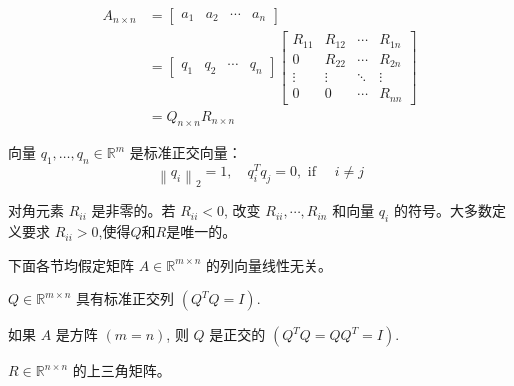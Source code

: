 \begin{theorem}[QR Factorization]
    
    \begin{equation}\begin{aligned} A_{n  \times n}&=\left[\begin{array}{llll}a_{1} & a_{2} & \cdots & a_{n}\end{array}\right]\\
        &=\left[\begin{array}{llll}q_{1} & q_{2} & \cdots & q_{n}\end{array}\right]\left[\begin{array}{cccc}R_{11} & R_{12} & \cdots & R_{1 n} \\ 0 & R_{22} & \cdots & R_{2 n} \\ \vdots & \vdots & \ddots & \vdots \\ 0 & 0 & \cdots & R_{n n}\end{array}\right]\\
        &=Q_{n  \times n}R_{n  \times  n}
        \end{aligned}\end{equation}

向量 $ q_{1}, \ldots, q_{n} \in \mathbb{R}^{m} $ 是标准正交向量：
\begin{equation}
\left\|q_{i}\right\|_{2}=1, \quad q_{i}^{T} q_{j}=0, \text { if } \quad i \neq j
\end{equation}

对角元素 $ R_{i i} $ 是非零的。若 $ R_{i i}<0 $, 改变 $ R_{i i}, \cdots, R_{i n} $ 和向量 $ q_{i} $ 的符号。大多数定义要求 $ R_{i i}>0 $,使得$Q$和$R$是唯一的。
\end{theorem}

\begin{remark}
    下面各节均假定矩阵 $ A \in \mathbb{R}^{m \times n} $ 的列向量线性无关。
\end{remark}

\begin{corollary}
    $ Q \in \mathbb{R}^{m \times n} $ 具有标准正交列 $ \left(Q^{T} Q=I\right) $.
\end{corollary}

\begin{corollary}
    如果 $ A $ 是方阵 $ ( {m}= {n}) $, 则 $ Q $ 是正交的 $ \left(Q^{T} Q=Q Q^{T}=I\right) $.
\end{corollary}

\begin{corollary}
    $ R \in \mathbb{R}^{n \times n} $ 的上三角矩阵。
\end{corollary}

